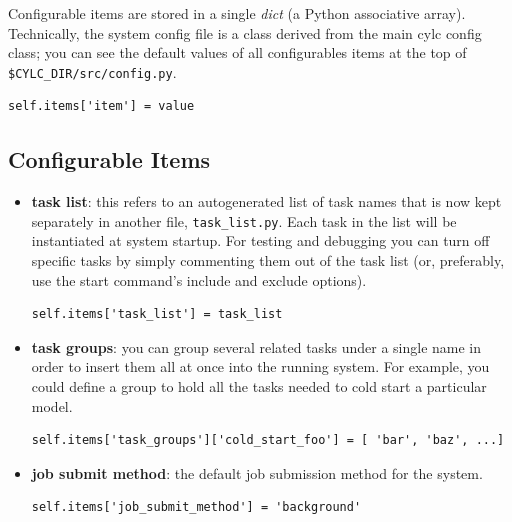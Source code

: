 \documentclass[11pt,a4paper]{article}
\begin{document}
Configurable items are stored in a single {\em dict} (a Python
associative array). Technically, the system config file is a class
derived from the main cylc config class; you can see the default
values of all configurables items at the top of
\lstinline=$CYLC_DIR/src/config.py=.

\lstset{language=Python}
\begin{lstlisting}
self.items['item'] = value
\end{lstlisting}

\subsection{Configurable Items}
\label{ConfigurableItems}

\begin{itemize} 
    
    \item {\bf task list}: this refers to an autogenerated list of task
        names that is now kept separately in another file,
        \lstinline=task_list.py=. Each task in the list will be
        instantiated at system startup.  For testing and debugging you
        can turn off specific tasks by simply commenting them out of the
        task list (or, preferably, use the start command's include and
        exclude options).
        
        \begin{lstlisting}
self.items['task_list'] = task_list
        \end{lstlisting}

    \item {\bf task groups}: you can group several related tasks under a
        single name in order to insert them all at once into the running
        system. For example, you could define a group to hold all the
        tasks needed to cold start a particular model.

        \begin{lstlisting}
self.items['task_groups']['cold_start_foo'] = [ 'bar', 'baz', ...]
        \end{lstlisting}

    \item {\bf job submit method}: the default job submission method 
        for the system.

        \begin{lstlisting}
self.items['job_submit_method'] = 'background'
        \end{lstlisting}


\end{itemize}
\end{document}

